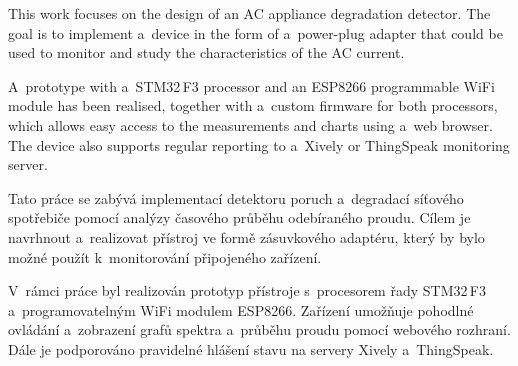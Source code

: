 
\begin{abstract-english}
	
\begin{otherlanguage}{english}
This work focuses on the design of an AC appliance degradation detector. The goal is to implement a~device in the form of a~power-plug adapter that could be used to monitor and study the characteristics of the AC current.

A~prototype with a~STM32\,F3 processor and an ESP8266 programmable WiFi module has been realised, together with a~custom firmware for both processors, which allows easy access to the measurements and charts using a~web browser. The device also supports regular reporting to a~Xively or ThingSpeak monitoring server.
\end{otherlanguage}

\end{abstract-english}


\begin{abstract-czech}
	
Tato práce se zabývá implementací detektoru poruch a~degradací síťového spotřebiče pomocí analýzy časového průběhu odebíraného proudu. Cílem je navrhnout a~realizovat přístroj ve formě zásuvkového adaptéru, který by bylo možné použít k~monitorování připojeného zařízení.

V~rámci práce byl realizován prototyp přístroje s~procesorem řady STM32\,F3 a~programovatelným WiFi modulem ESP8266. Zařízení umožňuje pohodlné ovládání a~zobrazení grafů spektra a~průběhu proudu pomocí webového rozhraní. Dále je podporováno pravidelné hlášení stavu na servery Xively a~ThingSpeak.

\end{abstract-czech}
